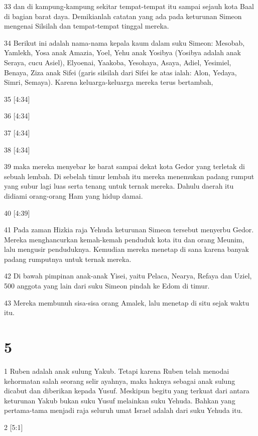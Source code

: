 \par 33 dan di kampung-kampung sekitar tempat-tempat itu sampai sejauh kota Baal di bagian barat daya. Demikianlah catatan yang ada pada keturunan Simeon mengenai Silsilah dan tempat-tempat tinggal mereka.
\par 34 Berikut ini adalah nama-nama kepala kaum dalam suku Simeon: Mesobab, Yamlekh, Yosa anak Amazia, Yoel, Yehu anak Yosibya (Yosibya adalah anak Seraya, cucu Asiel), Elyoenai, Yaakoba, Yesohaya, Asaya, Adiel, Yesimiel, Benaya, Ziza anak Sifei (garis silsilah dari Sifei ke atas ialah: Alon, Yedaya, Simri, Semaya). Karena keluarga-keluarga mereka terus bertambah,
\par 35 [4:34]
\par 36 [4:34]
\par 37 [4:34]
\par 38 [4:34]
\par 39 maka mereka menyebar ke barat sampai dekat kota Gedor yang terletak di sebuah lembah. Di sebelah timur lembah itu mereka menemukan padang rumput yang subur lagi luas serta tenang untuk ternak mereka. Dahulu daerah itu didiami orang-orang Ham yang hidup damai.
\par 40 [4:39]
\par 41 Pada zaman Hizkia raja Yehuda keturunan Simeon tersebut menyerbu Gedor. Mereka menghancurkan kemah-kemah penduduk kota itu dan orang Meunim, lalu mengusir penduduknya. Kemudian mereka menetap di sana karena banyak padang rumputnya untuk ternak mereka.
\par 42 Di bawah pimpinan anak-anak Yisei, yaitu Pelaca, Nearya, Refaya dan Uziel, 500 anggota yang lain dari suku Simeon pindah ke Edom di timur.
\par 43 Mereka membunuh sisa-sisa orang Amalek, lalu menetap di situ sejak waktu itu.

\chapter{5}

\par 1 Ruben adalah anak sulung Yakub. Tetapi karena Ruben telah menodai kehormatan salah seorang selir ayahnya, maka haknya sebagai anak sulung dicabut dan diberikan kepada Yusuf. Meskipun begitu yang terkuat dari antara keturunan Yakub bukan suku Yusuf melainkan suku Yehuda. Bahkan yang pertama-tama menjadi raja seluruh umat Israel adalah dari suku Yehuda itu.
\par 2 [5:1]

